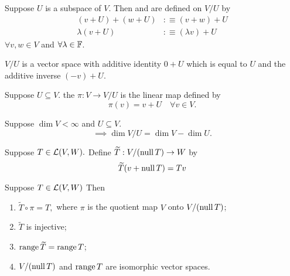 \begin{mydef} 
  Suppose $U$ is a subspace of $V$. Then  and  are defined on $V/U$ by
  \begin{equation}
    \begin{aligned}
      (v+U)+(w+U) & :\equiv (v+w) + U \\
      \lambda (v+U) & :\equiv (\lambda v) + U
    \end{aligned}
  \end{equation}
  $\forall v,w \in V$ and $\forall \lambda \in \mathbb{F}$.
\end{mydef}


\begin{thm} 
  $V/U$ is a vector space with additive identity $0+U$ which is equal to $U$ and the additive inverse $(-v)+U$.
\end{thm}

\begin{mydef} 
  Suppose $U \subseteq V$. the  $\pi: V \to V/U$ is the linear map defined by
  \begin{equation}
    \pi(v)=v+U \quad \forall v \in V.
  \end{equation}
\end{mydef}

\begin{thm}
  Suppose $\dim V < \infty$ and $U \subseteq V$.
  \begin{equation}
    \implies \dim V/U = \dim V - \dim U.
  \end{equation}
\end{thm}

\begin{mydef}
  Suppose $T \in \mathcal{L}(V,W).$ Define $\widetilde{T}: V/(\operatorname{null} T) \to W$ by
  \begin{equation}
    \widetilde{T}(v+\operatorname{null} T) = Tv
  \end{equation}
\end{mydef}

\begin{thm}
  Suppose $T\in \mathcal{L}(V,W)$ Then
  \begin{enumerate}[label=\textbf{(\alph*)}]
    \item $\widetilde{T} \circ \pi = T,$ where $\pi$ is the quotient map $V$ onto $V/(\operatorname{null} T)$;
    \item $\widetilde{T}$ is injective;
    \item $\operatorname{range} \widetilde{T} = \operatorname{range} T$;
    \item $V/(\operatorname{null} T)$ and $\operatorname{range} T$ are isomorphic vector spaces.
  \end{enumerate}
\end{thm}